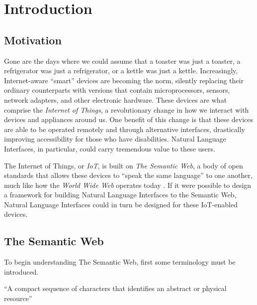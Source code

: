 \documentclass[../main.tex]{subfiles}
\begin{document}
\chapter{Introduction}


\section{Motivation}

Gone are the days where we could assume that a toaster was just a toaster, a refrigerator was just a refrigerator, or a kettle was just a kettle.
Increasingly, Internet-aware ``smart'' devices are becoming the norm, silently replacing their ordinary counterparts with versions that contain microprocessors,
sensors, network adapters, and other electronic hardware. These devices are what comprise the {\em Internet of Things}, a revolutionary change in how we interact with devices and appliances around us.  One benefit of this change is that these devices are able to be operated remotely and through alternative interfaces, drastically
improving accessibility for those who have disabilities.  Natural Language Interfaces, in particular, could carry tremendous value to these users.

The Internet of Things, or {\em IoT}, is built on {\em The Semantic Web}, a body of open standards that allows these devices to ``speak the same language'' to one another, much
like how the {\em World Wide Web} operates today \cite{semwebanalogy}.  If it were possible to design a framework for building Natural Language Interfaces to the Semantic Web,
Natural Language Interfaces could in turn be designed for these IoT-enabled devices.



\section{The Semantic Web}

To begin understanding The Semantic Web, first some terminology must be introduced.

\begin{definition}
	``A compact sequence of characters that identifies an abstract or physical resource'' \cite{w3curi}
\end{definition}
\end{document}
